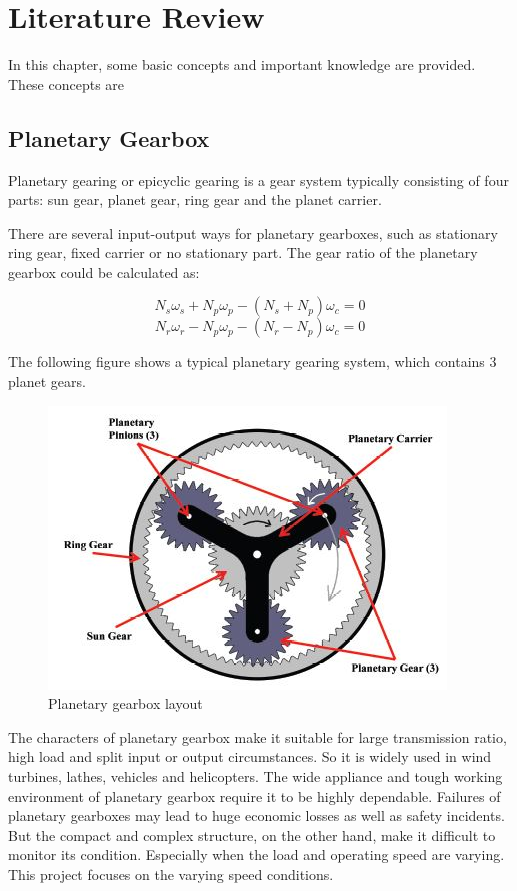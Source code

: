 \chapter{Literature Review}\label{ch:literature}

In this chapter, some basic concepts and important knowledge are provided. These concepts are 

\section{Planetary Gearbox}

Planetary gearing or epicyclic gearing is a gear system typically consisting of four parts: sun gear, planet gear, ring gear and the planet carrier.

There are several input-output ways for planetary gearboxes, such as stationary ring gear, fixed carrier or no stationary part. The gear ratio of the planetary gearbox could be calculated as:

\begin{equation}
	N_s\omega_s + N_p\omega_p - (N_s + N_p)\omega_c = 0
\end{equation}
\begin{equation}
	N_r\omega_r - N_p\omega_p - (N_r - N_p)\omega_c = 0
\end{equation}

The following figure shows a typical planetary gearing system, which contains 3 planet gears.

\begin{figure}
	\centering
	\includegraphics{PGB}
	\caption{Planetary gearbox layout \cite{gearbox}}
	\label{simulationfigure}
\end{figure}

The characters of planetary gearbox make it suitable for large transmission ratio, high load and split input or output circumstances. So it is widely used in wind turbines, lathes, vehicles and helicopters. The wide appliance and tough working environment of planetary gearbox require it to be highly dependable. Failures of planetary gearboxes may lead to huge economic losses as well as safety incidents. But the compact and complex structure, on the other hand, make it difficult to monitor its condition. Especially when the load and operating speed are varying. This project focuses on the varying speed conditions.


